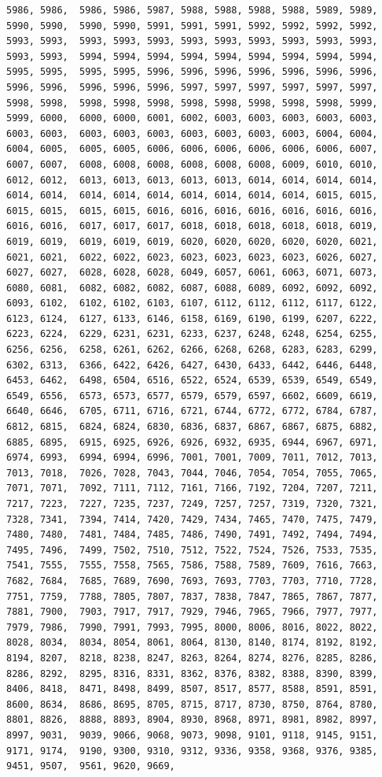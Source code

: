 \documentclass[
]{article}
\begin{document}
\begin{verbatim}
5986, 5986,  5986, 5986, 5987, 5988, 5988, 5988, 5988, 5989, 5989, 5990, 5990,  5990, 5990, 5991, 5991, 5991, 5992, 5992, 5992, 5992, 5993, 5993,  5993, 5993, 5993, 5993, 5993, 5993, 5993, 5993, 5993, 5993, 5993,  5994, 5994, 5994, 5994, 5994, 5994, 5994, 5994, 5994, 5995, 5995,  5995, 5995, 5996, 5996, 5996, 5996, 5996, 5996, 5996, 5996, 5996,  5996, 5996, 5996, 5997, 5997, 5997, 5997, 5997, 5997, 5998, 5998,  5998, 5998, 5998, 5998, 5998, 5998, 5998, 5998, 5999, 5999, 6000,  6000, 6000, 6001, 6002, 6003, 6003, 6003, 6003, 6003, 6003, 6003,  6003, 6003, 6003, 6003, 6003, 6003, 6003, 6004, 6004, 6004, 6005,  6005, 6005, 6006, 6006, 6006, 6006, 6006, 6006, 6007, 6007, 6007,  6008, 6008, 6008, 6008, 6008, 6008, 6009, 6010, 6010, 6012, 6012,  6013, 6013, 6013, 6013, 6013, 6014, 6014, 6014, 6014, 6014, 6014,  6014, 6014, 6014, 6014, 6014, 6014, 6014, 6015, 6015, 6015, 6015,  6015, 6015, 6016, 6016, 6016, 6016, 6016, 6016, 6016, 6016, 6016,  6017, 6017, 6017, 6018, 6018, 6018, 6018, 6018, 6019, 6019, 6019,  6019, 6019, 6019, 6020, 6020, 6020, 6020, 6020, 6021, 6021, 6021,  6022, 6022, 6023, 6023, 6023, 6023, 6023, 6026, 6027, 6027, 6027,  6028, 6028, 6028, 6049, 6057, 6061, 6063, 6071, 6073, 6080, 6081,  6082, 6082, 6082, 6087, 6088, 6089, 6092, 6092, 6092, 6093, 6102,  6102, 6102, 6103, 6107, 6112, 6112, 6112, 6117, 6122, 6123, 6124,  6127, 6133, 6146, 6158, 6169, 6190, 6199, 6207, 6222, 6223, 6224,  6229, 6231, 6231, 6233, 6237, 6248, 6248, 6254, 6255, 6256, 6256,  6258, 6261, 6262, 6266, 6268, 6268, 6283, 6283, 6299, 6302, 6313,  6366, 6422, 6426, 6427, 6430, 6433, 6442, 6446, 6448, 6453, 6462,  6498, 6504, 6516, 6522, 6524, 6539, 6539, 6549, 6549, 6549, 6556,  6573, 6573, 6577, 6579, 6579, 6597, 6602, 6609, 6619, 6640, 6646,  6705, 6711, 6716, 6721, 6744, 6772, 6772, 6784, 6787, 6812, 6815,  6824, 6824, 6830, 6836, 6837, 6867, 6867, 6875, 6882, 6885, 6895,  6915, 6925, 6926, 6926, 6932, 6935, 6944, 6967, 6971, 6974, 6993,  6994, 6994, 6996, 7001, 7001, 7009, 7011, 7012, 7013, 7013, 7018,  7026, 7028, 7043, 7044, 7046, 7054, 7054, 7055, 7065, 7071, 7071,  7092, 7111, 7112, 7161, 7166, 7192, 7204, 7207, 7211, 7217, 7223,  7227, 7235, 7237, 7249, 7257, 7257, 7319, 7320, 7321, 7328, 7341,  7394, 7414, 7420, 7429, 7434, 7465, 7470, 7475, 7479, 7480, 7480,  7481, 7484, 7485, 7486, 7490, 7491, 7492, 7494, 7494, 7495, 7496,  7499, 7502, 7510, 7512, 7522, 7524, 7526, 7533, 7535, 7541, 7555,  7555, 7558, 7565, 7586, 7588, 7589, 7609, 7616, 7663, 7682, 7684,  7685, 7689, 7690, 7693, 7693, 7703, 7703, 7710, 7728, 7751, 7759,  7788, 7805, 7807, 7837, 7838, 7847, 7865, 7867, 7877, 7881, 7900,  7903, 7917, 7917, 7929, 7946, 7965, 7966, 7977, 7977, 7979, 7986,  7990, 7991, 7993, 7995, 8000, 8006, 8016, 8022, 8022, 8028, 8034,  8034, 8054, 8061, 8064, 8130, 8140, 8174, 8192, 8192, 8194, 8207,  8218, 8238, 8247, 8263, 8264, 8274, 8276, 8285, 8286, 8286, 8292,  8295, 8316, 8331, 8362, 8376, 8382, 8388, 8390, 8399, 8406, 8418,  8471, 8498, 8499, 8507, 8517, 8577, 8588, 8591, 8591, 8600, 8634,  8686, 8695, 8705, 8715, 8717, 8730, 8750, 8764, 8780, 8801, 8826,  8888, 8893, 8904, 8930, 8968, 8971, 8981, 8982, 8997, 8997, 9031,  9039, 9066, 9068, 9073, 9098, 9101, 9118, 9145, 9151, 9171, 9174,  9190, 9300, 9310, 9312, 9336, 9358, 9368, 9376, 9385, 9451, 9507,  9561, 9620, 9669, 
\end{verbatim}
\end{document}
